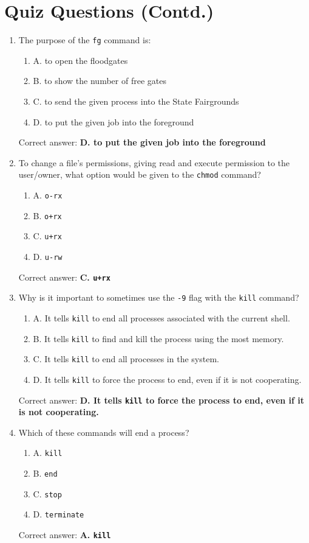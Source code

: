 \documentclass{article}
\begin{document}
\section*{Quiz Questions (Contd.)}

\begin{enumerate}
  \item The purpose of the \texttt{fg} command is:
  \begin{enumerate}
    \item A. to open the floodgates
    \item B. to show the number of free gates
    \item C. to send the given process into the State Fairgrounds
    \item D. to put the given job into the foreground
  \end{enumerate}
  Correct answer: \textbf{D. to put the given job into the foreground}
  
  \item To change a file’s permissions, giving read and execute permission to the user/owner, what option would be given to the \texttt{chmod} command?
  \begin{enumerate}
    \item A. \texttt{o-rx}
    \item B. \texttt{o+rx}
    \item C. \texttt{u+rx}
    \item D. \texttt{u-rw}
  \end{enumerate}
  Correct answer: \textbf{C. \texttt{u+rx}}
  
  \item Why is it important to sometimes use the \texttt{-9} flag with the \texttt{kill} command?
  \begin{enumerate}
    \item A. It tells \texttt{kill} to end all processes associated with the current shell.
    \item B. It tells \texttt{kill} to find and kill the process using the most memory.
    \item C. It tells \texttt{kill} to end all processes in the system.
    \item D. It tells \texttt{kill} to force the process to end, even if it is not cooperating.
  \end{enumerate}
  Correct answer: \textbf{D. It tells \texttt{kill} to force the process to end, even if it is not cooperating.}
  
  \item Which of these commands will end a process?
  \begin{enumerate}
    \item A. \texttt{kill}
    \item B. \texttt{end}
    \item C. \texttt{stop}
    \item D. \texttt{terminate}
  \end{enumerate}
  Correct answer: \textbf{A. \texttt{kill}}
  

\end{enumerate}
\end{document}
